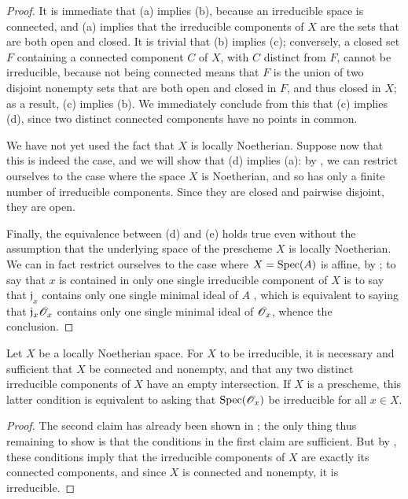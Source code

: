 \begin{proof}
\label{proof-I.6.1.10}
It is immediate that (a) implies (b), because an irreducible space is connected, and (a) implies that the irreducible components of $X$ are the sets that are both open and closed.
It is trivial that (b) implies (c); conversely, a closed set $F$ containing
a connected component $C$ of $X$, with $C$ distinct from $F$, cannot be irreducible, because not being connected means that $F$ is the union of two disjoint nonempty sets that are both open and closed in $F$, and thus closed in $X$; as a result, (c) implies (b).
We immediately conclude from this that (c) implies (d), since two distinct connected components have no points in common.

We have not yet used the fact that $X$ is locally Noetherian.
Suppose now that this is indeed the case, and we will show that (d) implies (a): by , we can restrict ourselves to the case where the space $X$ is Noetherian, and so has only a finite number of irreducible components.
Since they are closed and pairwise disjoint, they are open.

Finally, the equivalence between (d) and (e) holds true even without the assumption that the underlying space of the prescheme $X$ is locally Noetherian.
We can in fact restrict ourselves to the case where $X=\operatorname{Spec}(A)$ is affine, by ;
to say that $x$ is contained in only one single irreducible component of $X$ is to say that $\mathfrak{j}_x$ contains only one single minimal ideal of $A$ , which is equivalent to saying that $\mathfrak{j}_x\mathscr{O}_x$ contains only one single minimal ideal of $\mathscr{O}_x$, whence the conclusion.
\end{proof}

\begin{corollary}[6.1.11]
\label{I.6.1.11}
Let $X$ be a locally Noetherian space.
For $X$ to be irreducible, it is necessary and sufficient that $X$ be connected and nonempty, and that any two distinct irreducible components of $X$ have an empty intersection.
If $X$ is a prescheme, this latter condition is equivalent to asking that $\operatorname{Spec}(\mathscr{O}_x)$ be irreducible for all $x\in X$.
\end{corollary}

\begin{proof}
\label{proof-I.6.1.11}
The second claim has already been shown in ;
the only thing thus remaining to show is that the conditions in the first claim are sufficient.
But by , these conditions imply that the irreducible components of $X$ are exactly its connected components, and since $X$ is connected and nonempty, it is irreducible.
\end{proof}


